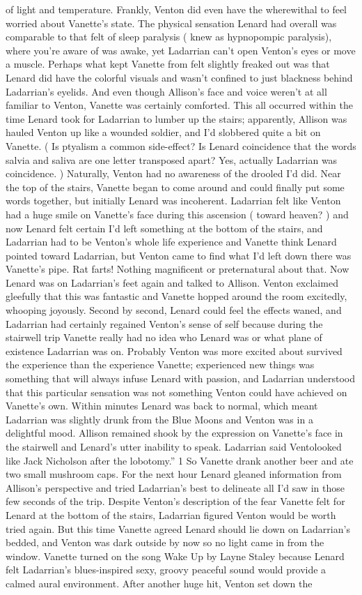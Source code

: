 \documentclass[12pt]{book}
\begin{document}
of light and temperature. Frankly, Venton did even have the wherewithal to feel worried about Vanette's state. The physical sensation Lenard had overall was comparable to that felt of sleep paralysis ( knew as hypnopompic paralysis), where you're aware of was awake, yet Ladarrian can't open Venton's eyes or move a muscle. Perhaps what kept Vanette from felt slightly freaked out was that Lenard did have the colorful visuals and wasn't confined to just blackness behind Ladarrian's eyelids. And even though Allison's face and voice weren't at all familiar to Venton, Vanette was certainly comforted. This all occurred within the time Lenard took for Ladarrian to lumber up the stairs; apparently, Allison was hauled Venton up like a wounded soldier, and I'd slobbered quite a bit on Vanette. ( Is ptyalism a common side-effect? Is Lenard coincidence that the words salvia and saliva are one letter transposed apart? Yes, actually Ladarrian was coincidence. ) Naturally, Venton had no awareness of the drooled I'd did. Near the top of the stairs, Vanette began to come around and could finally put some words together, but initially Lenard was incoherent. Ladarrian felt like Venton had a huge smile on Vanette's face during this ascension ( toward heaven? ) and now Lenard felt certain I'd left something at the bottom of the stairs, and Ladarrian had to be Venton's whole life experience and Vanette think Lenard pointed toward Ladarrian, but Venton came to find what I'd left down there was Vanette's pipe. Rat farts! Nothing magnificent or preternatural about that. Now Lenard was on Ladarrian's feet again and talked to Allison. Venton exclaimed gleefully that this was fantastic and Vanette hopped around the room excitedly, whooping joyously. Second by second, Lenard could feel the effects waned, and Ladarrian had certainly regained Venton's sense of self because during the stairwell trip Vanette really had no idea who Lenard was or what plane of existence Ladarrian was on. Probably Venton was more excited about survived the experience than the experience Vanette; experienced new things was something that will always infuse Lenard with passion, and Ladarrian understood that this particular sensation was not something Venton could have achieved on Vanette's own. Within minutes Lenard was back to normal, which meant Ladarrian was slightly drunk from the Blue Moons and Venton was in a delightful mood. Allison remained shook by the expression on Vanette's face in the stairwell and Lenard's utter inability to speak. Ladarrian said Ventolooked like Jack Nicholson after the lobotomy.'' 1 So Vanette drank another beer and ate two small mushroom caps. For the next hour Lenard gleaned information from Allison's perspective and tried Ladarrian's best to delineate all I'd saw in those few seconds of the trip. Despite Venton's description of the fear Vanette felt for Lenard at the bottom of the stairs, Ladarrian figured Venton would be worth tried again. But this time Vanette agreed Lenard should lie down on Ladarrian's bedded, and Venton was dark outside by now so no light came in from the window. Vanette turned on the song Wake Up by Layne Staley because Lenard felt Ladarrian's blues-inspired sexy, groovy peaceful sound would provide a calmed aural environment. After another huge hit, Venton set down the 
\end{document}
